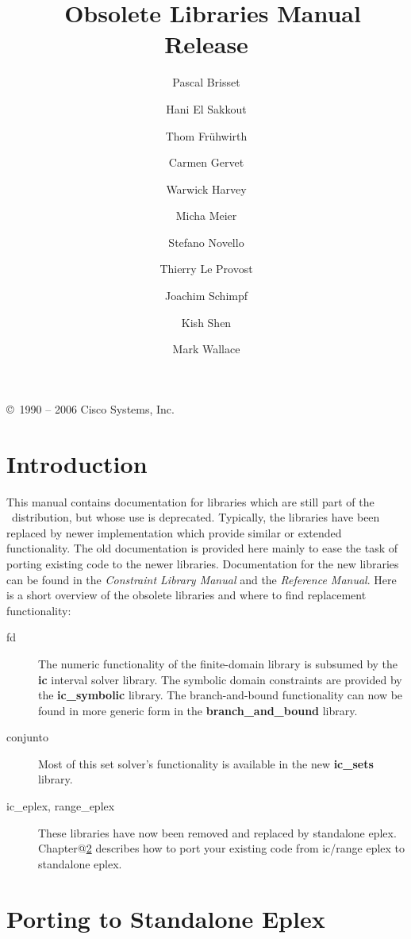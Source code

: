\documentclass[11pt,a4paper]{book}
\title{{\Huge \eclipse\ Obsolete Libraries Manual}\\
	\vspace{1cm}
	Release \eclipseversion
    }
\author{
Pascal Brisset
\and Hani El Sakkout
\and Thom Fr\"{u}hwirth
\and Carmen Gervet
\and Warwick Harvey
\and Micha Meier
\and Stefano Novello
\and Thierry Le Provost
\and Joachim Schimpf
\and Kish Shen
\and Mark Wallace}
\begin{document}
\maketitle

\setcounter{page}{2}
\pagestyle{empty}

\vfill

\copyright\ 1990 -- 2006 Cisco Systems, Inc.

\bigskip\bigskip\bigskip\bigskip\bigskip\bigskip

\cleardoublepage
\pagestyle{plain}

\begin{latexonly}
\tableofcontents
\end{latexonly}

\cleardoublepage
{}

\chapter{Introduction}
This manual contains documentation for libraries which are still part
of the \eclipse\ distribution, but whose use is deprecated.
Typically, the libraries have been replaced by newer implementation which
provide similar or extended functionality.
The old documentation is provided here mainly to ease the task of porting
existing code to the newer libraries. Documentation for the new libraries
can be found in the {\em Constraint Library Manual} and the {\em Reference Manual}.
Here is a short overview of the obsolete libraries and where to find
replacement functionality:
\begin{description}
\item[fd] The numeric functionality of the finite-domain library is
    subsumed by the {\bf ic} interval solver library.
    The symbolic domain constraints are provided by the {\bf ic_symbolic}
    library.
    The branch-and-bound functionality can now be found in more generic
    form in the {\bf branch_and_bound} library.
\item[conjunto] Most of this set solver's functionality is available in the
    new {\bf ic_sets} library.
\item[ic_eplex, range_eplex] These libraries have now been removed and
  replaced by standalone eplex. Chapter@\ref{eplexstandalone} describes how
  to port your existing code from ic/range eplex to standalone eplex. 

\end{description}





\chapter{Porting to Standalone Eplex}
\label{eplexstandalone}



\newpage
\printindex
\newpage


\end{document}
